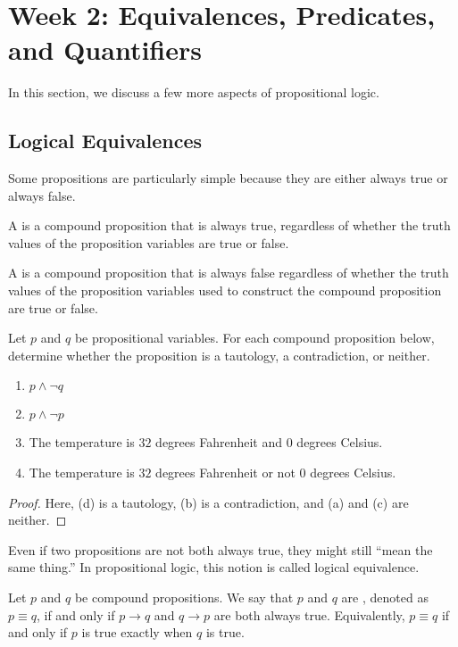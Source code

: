 \documentclass[../main.tex]{subfiles}
\begin{document}
\section{Week 2: Equivalences, Predicates, and Quantifiers }
In this section, we discuss a few more aspects of propositional logic.

\subsection{Logical Equivalences}
Some propositions are particularly simple because they are either always true or always false.
\begin{definition}[tautology]
    A  is a compound proposition that is always true, regardless of whether the truth values of the proposition variables are true or false. 
\end{definition}
\begin{definition}[contradiction]
    A  is a compound proposition that is always false regardless of whether the truth values of the proposition variables used to construct the compound proposition are true or false.
\end{definition}
\begin{example}
    Let $p$ and $q$ be propositional variables. For each compound proposition below, determine whether the proposition is a tautology, a contradiction, or neither. 
    \begin{enumerate}[label=(\alph*)]
        \item $p \land \neg q$
        \item $p \land \neg p$
        \item The temperature is $32$ degrees Fahrenheit and $0$ degrees Celsius.
        \item The temperature is $32$ degrees Fahrenheit or not $0$ degrees Celsius.
    \end{enumerate}
\end{example}
\begin{proof}
    Here, (d) is a tautology, (b) is a contradiction, and (a) and (c) are neither.
\end{proof}
Even if two propositions are not both always true, they might still ``mean the same thing.'' In propositional logic, this notion is called logical equivalence.
\begin{definition}
    Let $p$ and $q$ be compound propositions. We say that $p$ and $q$ are , denoted as $p \equiv q$, if and only if $p \rightarrow q$ and $q \rightarrow p$ are both always true. Equivalently, $p\equiv q$ if and only if $p$ is true exactly when $q$ is true.
\end{definition}
\end{document}
